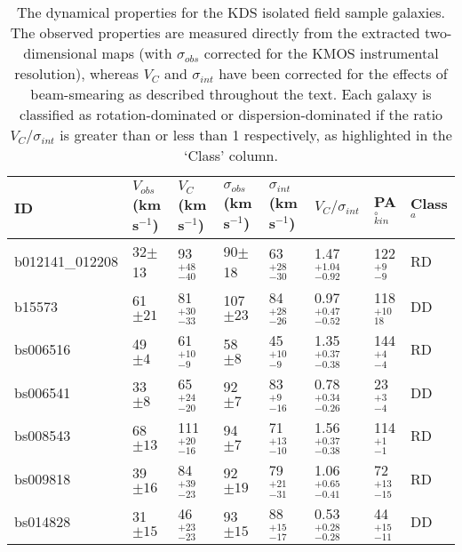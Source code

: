 \documentclass[fleqn,usenatbib]{mnras}
\begin{document}
\begin{table*}
\centering
\begin{threeparttable}
\caption{The dynamical properties for the KDS isolated field sample galaxies.
The observed properties are measured directly from the extracted two-dimensional maps (with $\sigma_{obs}$ corrected for the KMOS instrumental resolution), whereas $V_{C}$ and $\sigma_{int}$ have been corrected for the effects of beam-smearing as described throughout the text.
Each galaxy is classified as rotation-dominated or dispersion-dominated if the ratio $V_{C}/\sigma_{int}$ is greater than or less than 1 respectively, as highlighted in the `Class' column.}
\label{tab:kin_props}
\begin{tabular}{llllllll}

 \hline
ID & $V_{obs}$(km\,s$^{-1}$) & $V_{C}$(km\,s$^{-1}$) & $\sigma_{obs}$(km\,s$^{-1}$) & $\sigma_{int}$(km\,s$^{-1}$) & $V_{C}/\sigma_{int}$ & PA$_{kin}^{\circ}$ & Class$^{a}$ \\
 \hline
b012141\_012208 & 32$\pm$13                    & 93$^{+48}_{-40}$                     & 90$\pm$18                 & 63$^{+28}_{-30}$                 & 1.47$^{+1.04}_{-0.92}$             & 122$^{+9}_{-9}$ & RD   \\[1ex]
b15573          & 61$\pm21$                    & 81$^{+30}_{-33}$                     & 107$\pm23$                 & 84$^{+28}_{-26}$          & 0.97$^{+0.47}_{-0.52}$            & 118$^{+10}_{18}$ & DD   \\[1ex]
bs006516        & 49$\pm4$                    & 61$^{+10}_{-9}$                     & 58$\pm8$                  & 45$^{+10}_{-9}$              & 1.35$^{+0.37}_{-0.38}$         & 144$^{+4}_{-4}$ & RD   \\[1ex]
bs006541        & 33$\pm8$                      & 65$^{+24}_{-20}$                  & 92$\pm7$                  & 83$^{+9}_{-16}$             & 0.78$^{+0.34}_{-0.26}$          & 23$^{+3}_{-4}$ & DD    \\[1ex]
bs008543        & 68$\pm13$                    & 111$^{+20}_{-16}$                    & 94$\pm7$                  & 71$^{+13}_{-10}$         & 1.56$^{+0.37}_{-0.38}$                & 114$^{+1}_{-1}$  & RD  \\[1ex]
bs009818        & 39$\pm16$                    & 84$^{+39}_{-23}$                     & 92$\pm19$                  & 79$^{+21}_{-31}$       & 1.06$^{+0.65}_{-0.41}$                   & 72$^{+13}_{-15}$ & RD    \\[1ex]
bs014828        & 31$\pm15$                    & 46$^{+23}_{-23}$                     & 93$\pm15$                  & 88$^{+15}_{-17}$      & 0.53$^{+0.28}_{-0.28}$               & 44$^{+15}_{-11}$  & DD  \\[1ex]

\end{tabular}
\end{threeparttable}
\end{table*}
\end{document}
